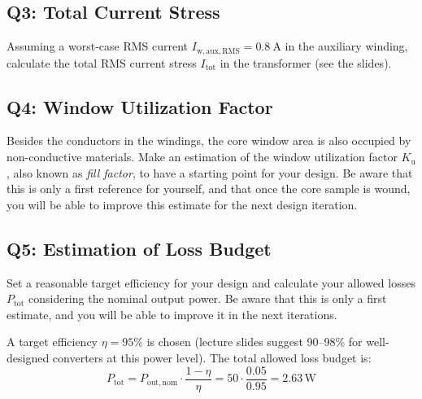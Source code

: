 \documentclass{PELsmallreport}
\begin{document}



\subsection{Q3: Total Current Stress} 
Assuming a worst-case RMS current  $I_{\mathrm{w,aux,RMS}} = \qty{0.8}{\A}$ in the auxiliary winding, calculate the total RMS current stress $I_{\mathrm{tot}}$ in the transformer (see the slides). 
\\

 \hfill{}




\subsection{Q4: Window Utilization Factor} 
Besides the conductors in the windings, the core window area is also occupied by non-conductive materials. 
Make an estimation of the window utilization factor $K_\mathrm{u}$, also known as \textit{fill factor}, to have a starting point for your design. 
Be aware that this is only a first reference for yourself, and that once the core sample is wound, you will be able to improve this estimate for the next design iteration. \\

 \hfill{}



\subsection{Q5: Estimation of Loss Budget} 
Set a reasonable target efficiency for your design and calculate your allowed losses  $P_\mathrm{tot}$ considering the nominal output power. 
Be aware that this is only a first estimate, and you will be able to improve it in the next iterations. \\

\begin{framed}
A target efficiency $\eta = 95\%$ is chosen (lecture slides suggest 90--98\% for well-designed converters at this power level). The total allowed loss budget is:
\begin{equation}
    P_\mathrm{tot} = P_\mathrm{out,nom} \cdot \frac{1-\eta}{\eta} = 50 \cdot \frac{0.05}{0.95} = 2.63\,\mathrm{W}
\end{equation}
\end{framed}
\end{document}
